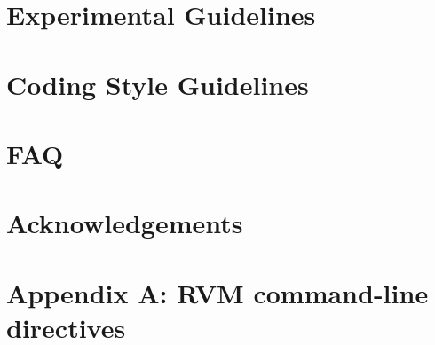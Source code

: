 \documentclass{article}
\begin{document}
\T \newpage
\section{Experimental Guidelines}


\T \newpage
\section{Coding Style Guidelines}


\T \newpage
\section{FAQ}


\T \newpage
\section*{Acknowledgements}


\T \newpage
\T 
\T 

\T \newpage
\section{Appendix A: RVM command-line directives}
\label{appendix:nonadaptive:cmdline}


\W \section*{\indexname}\label{hlxindex}
\W \htmlprintindex
\T \printindex
\end{document}

